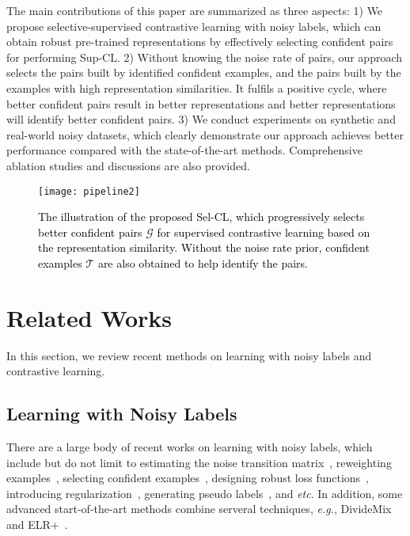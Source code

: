 \documentclass[10pt,twocolumn,letterpaper]{article}
\begin{document}
The main contributions of this paper are summarized as three aspects:
1) We propose selective-supervised contrastive learning with noisy labels, which can obtain robust pre-trained representations by effectively selecting confident pairs for performing Sup-CL.
2) Without knowing the noise rate of pairs, our approach selects the pairs built by identified confident examples, and the pairs built by the examples with high representation similarities. It fulfils a positive cycle, where better confident pairs result in better representations and better representations will identify better confident pairs. 
3) We conduct experiments on synthetic and real-world noisy datasets, which clearly demonstrate our approach achieves better performance compared with the state-of-the-art methods. Comprehensive ablation studies and discussions are also provided. 



\begin{figure*}
	\centering
	\texttt{[image: pipeline2]}
	\caption{\textcolor{black}{The illustration of the proposed Sel-CL, which progressively selects better confident pairs $\mathcal{G}$ for supervised contrastive learning based on the representation similarity. Without the noise rate prior, confident examples $\mathcal{T}$ are also obtained to help identify the pairs.}}
	\label{fig:pipeline}
\end{figure*}

\section{Related Works}\label{sec:2}
In this section, we review recent methods on learning with noisy labels and contrastive learning. 

\subsection{Learning with Noisy Labels}
There are a large body of recent works on learning with noisy labels, which include but do not limit to estimating the noise transition
matrix~\cite{HendrycksMWG18,xia2019anchor,xia2020part,cheng2022cvpr}, reweighting examples~\cite{Liu2016TPAMI,RenZYU18,ShuXY0ZXM19,wang2021graph}, selecting confident examples~\cite{huang2019o2u,YangICML2020,chen2022anomman,Li2020aaai}, designing robust loss functions~\cite{zhang2018generalized,GhoshKS17,ChengZLGSL21,wei2021robust}, introducing regularization~\cite{zhang2018mixup,hu2020simple,chen2021noise}, generating pseudo labels~\cite{tanaka2018joint,zheng2020error,zhang2021learningwith,han2019deep,Li2021TMM}, and \textit{etc}. In addition, some advanced start-of-the-art methods combine serveral techniques, \textit{e.g.}, DivideMix~\cite{LiSH20} and ELR+~\cite{LiuNRF20}.
\end{document}
